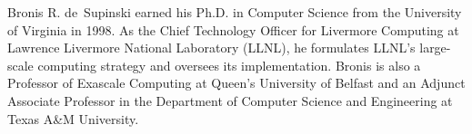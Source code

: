 \begin{IEEEbiography}{Bronis R. de~Supinski}
earned his Ph.D. in Computer Science from the University 
of Virginia in 1998. As the Chief Technology Officer for 
Livermore Computing at Lawrence Livermore National Laboratory 
(LLNL), he formulates LLNL's large-scale computing strategy 
and oversees its implementation. Bronis is also a Professor 
of Exascale Computing at Queen's University of Belfast and 
an Adjunct Associate Professor in the Department of Computer 
Science and Engineering at Texas A\&M University.
\end{IEEEbiography}

